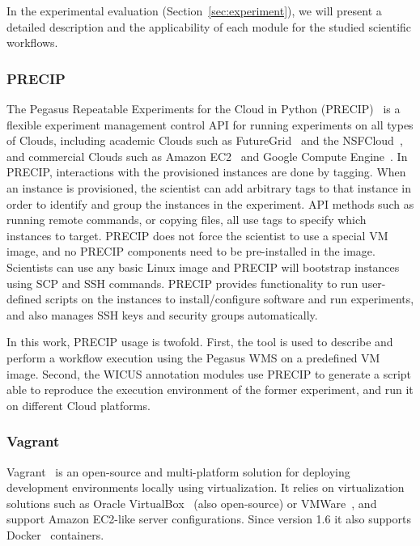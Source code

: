 In the experimental evaluation (Section~\ref{sec:experiment}), we will present a detailed description 
and the applicability of each module for the studied scientific workflows.



\subsubsection{PRECIP}
The Pegasus Repeatable Experiments for the Cloud in Python (PRECIP)~\cite{Azarnoosh-CRC-2013} 
is a flexible experiment management control API for running experiments on all types of Clouds, 
including academic Clouds such as FutureGrid~\cite{futuregrid} and the NSFCloud~\cite{chameleon,cloudlab}, 
and commercial Clouds such as Amazon EC2~\cite{aws} and Google Compute Engine~\cite{gce}. 
In PRECIP, interactions with the provisioned instances are done by tagging. When an instance is 
provisioned, the scientist can add arbitrary tags to that instance in order to identify and group the 
instances in the experiment. API methods such as running remote commands, or copying files, all 
use tags to specify which instances to target. PRECIP does not force the scientist to use a special 
VM image, and no PRECIP components need to be pre-installed in the image. Scientists can use 
any basic Linux image and PRECIP will bootstrap instances using SCP and SSH commands. 
PRECIP provides functionality to run user-defined scripts on the instances to install/configure 
software and run experiments, and also manages SSH keys and security groups automatically.

In this work, PRECIP usage is twofold. First, the tool is used to describe and perform a workflow 
execution using the Pegasus WMS on a predefined VM image. Second, the WICUS annotation 
modules use PRECIP to generate a script able to reproduce the execution environment of the 
former experiment, and run it on different Cloud platforms.


\subsubsection{Vagrant}

Vagrant~\cite{palat2012introducing} is an open-source and multi-platform solution for deploying 
development environments locally using virtualization. It relies on virtualization solutions such as 
Oracle VirtualBox~\cite{Watson2008} (also open-source) or  VMWare~\cite{vmware}, and support 
Amazon EC2-like server configurations. Since version 1.6 it also supports Docker~\cite{Merkel2014} 
containers.

